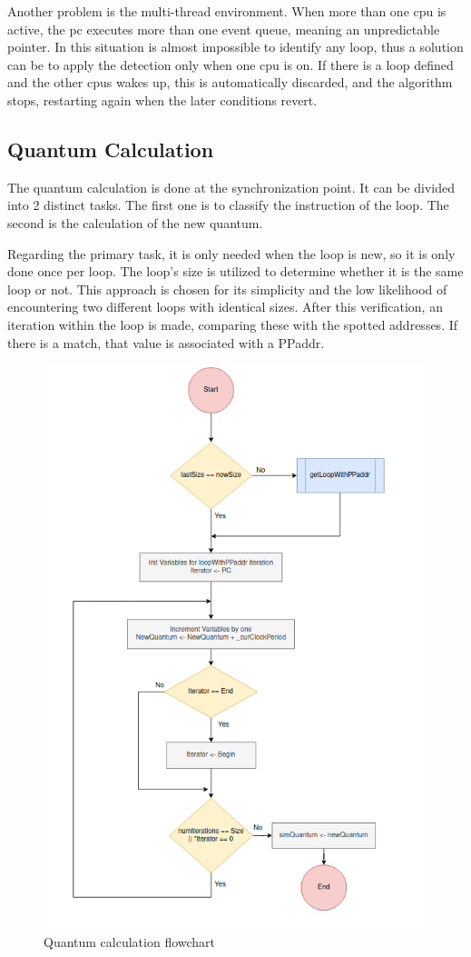 Another problem is the multi-thread environment. When more than one \gls{cpu} is active, the \gls{pc} executes more than one event queue, 
meaning an unpredictable pointer. In this situation is almost impossible to identify any loop, thus a solution can be to apply the detection 
only when one \gls{cpu} is on. If there is a loop defined and the other \glspl{cpu} wakes up, this is automatically discarded, and the algorithm 
stops, restarting again when the later conditions revert. 

\subsection{Quantum Calculation}

The quantum calculation is done at the synchronization point. It can be divided into 2 distinct tasks. The first one is to classify the 
instruction of the loop. The second is the calculation of the new quantum. 

Regarding the primary task, it is only needed when the loop is new, so it is only done once per loop. The loop's size is utilized to 
determine whether it is the same loop or not. This approach is chosen for its simplicity and the low likelihood of encountering two different 
loops with identical sizes. After this verification, an iteration within the loop is made, comparing these with the spotted addresses. If there 
is a match, that value is associated with a PPaddr. 

\begin{figure}[H]
	\centering
 	\includegraphics[width=0.6\linewidth]{Images/Repetition_flowchart_quantum.png}
 	\caption{Quantum calculation flowchart}
	 \label{fig_Repetition_flowchart_quantum}
\end{figure}

